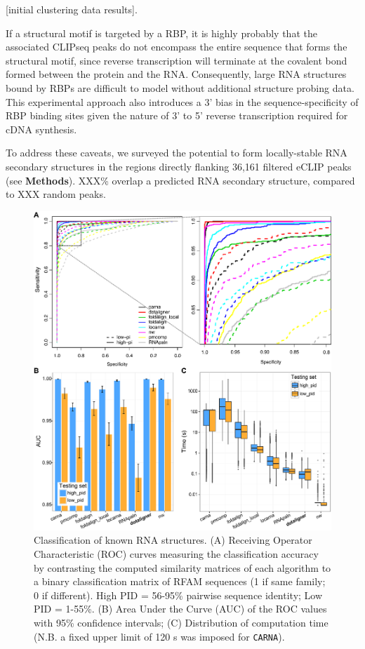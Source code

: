 \documentclass[a4paper,11pt]{article}
\newcommand\carna{\texttt{CARNA}}
\begin{document}
[initial clustering data results]. 

If a structural motif is targeted by a RBP, it is highly probably that the associated CLIPseq peaks 
do not encompass the entire sequence that forms the structural motif, since 
reverse transcription will terminate at the covalent bond formed between the 
protein and the RNA. Consequently, large RNA structures bound by RBPs are 
difficult to model without additional structure probing data. This experimental 
approach also introduces a 3' bias in the sequence-specificity of RBP binding sites 
given the nature of 3' to 5' reverse transcription required for cDNA synthesis.

To address these caveats, we surveyed the potential to form locally-stable
RNA secondary structures in the regions directly flanking 36,161 filtered eCLIP 
peaks (see \textbf{Methods}). XXX\% overlap a predicted RNA secondary structure, 
compared to XXX random peaks. 

\begin{figure}
 \includegraphics[width=\textwidth]{fig2}
 \caption { Classification of known RNA structures. 
 (A) Receiving Operator Characteristic (ROC) curves measuring the classification
 accuracy by contrasting the computed similarity matrices of each algorithm 
 to a binary classification matrix of RFAM  sequences (1 if same family; 
 0 if different). High PID =  56-95\% pairwise sequence identity; Low PID  = 1-55\%.
 (B) Area Under the Curve (AUC) of the ROC values with 95\% confidence intervals; 
 (C) Distribution of computation time (N.B. a fixed upper limit of 120 s was 
 imposed for \carna{}). 
 }
\end{figure}
\end{document}
